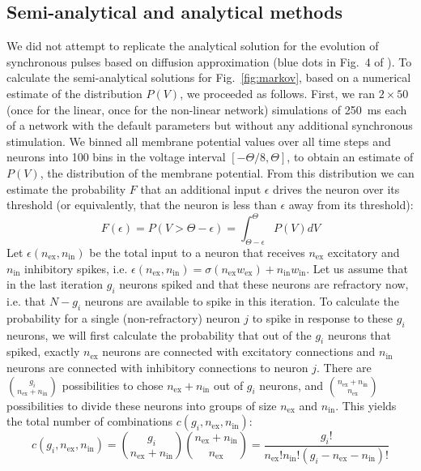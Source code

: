 \documentclass[10pt,a4paper,onecolumn]{article}
\begin{document}
\subsection*{Semi-analytical and analytical methods}
We did not attempt to replicate the analytical solution for the evolution of synchronous pulses based on diffusion approximation (blue dots in Fig.~4 of \cite{Memmesheimer2012}).
To calculate the semi-analytical solutions for Fig.~\ref{fig:markov}, based on a numerical estimate of the distribution $P(V)$, we proceeded as follows. First, we ran $2\times 50$ (once for the linear, once for the non-linear network) simulations of \SI{250}{\milli\second} each of a network with the default parameters but without any additional synchronous stimulation.  We binned all membrane potential values over all time steps and neurons into 100 bins in the voltage interval $[-\Theta/8, \Theta]$, to obtain an estimate of $P(V)$, the distribution of the membrane potential. From this distribution we can estimate the probability $F$ that an additional input $\epsilon$ drives the neuron over its threshold (or equivalently, that the neuron is less than $\epsilon$ away from its threshold):
\begin{equation}
F(\epsilon) = P(V>\Theta-\epsilon) = \int_{\Theta-\epsilon}^{\Theta}P(V)dV
\end{equation}
Let $\epsilon(n_\text{ex}, n_\text{in})$ be the total input to a neuron that receives $n_\text{ex}$ excitatory and $n_\text{in}$ inhibitory spikes, i.e. $\epsilon(n_\text{ex}, n_\text{in}) = \sigma(n_\text{ex}w_\text{ex}) + n_\text{in}w_\text{in}$. Let us assume that in the last iteration $g_i$ neurons spiked and that these neurons are refractory now, i.e. that $N-g_i$ neurons are available to spike in this iteration. To calculate the probability for a single (non-refractory) neuron $j$ to spike in response to these $g_i$ neurons, we will first calculate the probability that out of the $g_i$ neurons that spiked, exactly $n_\text{ex}$ neurons are connected with excitatory connections and $n_\text{in}$ neurons are connected with inhibitory connections to neuron $j$. There are $\binom{g_i}{n_\text{ex} + n_\text{in}}$ possibilities to chose $n_\text{ex} + n_\text{in}$ out of $g_i$ neurons, and $\binom{n_\text{ex} + n_\text{in}}{n_\text{ex}}$ possibilities to divide these neurons into groups of size $n_\text{ex}$ and $n_\text{in}$. This yields the total number of combinations $c(g_i, n_\text{ex}, n_\text{in})$:
\begin{equation}
c(g_i, n_\text{ex}, n_\text{in}) = \binom{g_i}{n_\text{ex} + n_\text{in}}\binom{n_\text{ex} + n_\text{in}}{n_\text{ex}} = \frac{g_i!}{n_\text{ex}!n_\text{in}!(g_i - n_\text{ex} - n_\text{in})!}
\end{equation}
\end{document}
